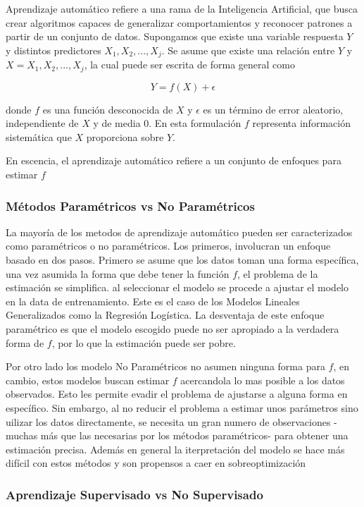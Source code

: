 \documentclass[a4paper,12pt]{Latex/Classes/PhDthesisPSnPDF}
\begin{document}
Aprendizaje automático refiere a una rama de la Inteligencia Artificial, que busca crear algoritmos capaces de generalizar comportamientos y reconocer patrones a partir de un conjunto de datos. Supongamos que existe una variable respuesta $Y$ y distintos predictores $X_{1}, X_{2}, ..., X_{j}$. Se asume que existe una relación entre $Y$ y $X = X_{1}, X_{2}, ..., X_{j}$, la cual puede ser escrita de forma general como

$$ Y = f(X) + \epsilon $$

donde $f$ es una función desconocida de $X$ y $\epsilon$ es un término de error aleatorio, independiente de $X$ y de media 0. En esta formulación $f$ representa información sistemática que $X$ proporciona sobre $Y$.

En escencia, el aprendizaje automático refiere a un conjunto de enfoques para estimar $f$

\subsubsection{Métodos Paramétricos vs No Paramétricos}

La mayoría de los metodos de aprendizaje automático pueden ser caracterizados como paramétricos o no paramétricos. Los primeros, involucran un enfoque basado en dos pasos. Primero se asume que los datos toman una forma específica, una vez asumida la forma que debe tener la función $f$, el problema de la estimación se simplifica. al seleccionar el modelo se procede a ajustar el modelo en la data de entrenamiento. Este es el caso de los Modelos Lineales Generalizados como la Regresión Logística. La desventaja de este enfoque paramétrico es que el modelo escogido puede no ser apropiado a la verdadera forma de $f$, por lo que la estimación puede ser pobre.

Por otro lado los modelo No Paramétricos no asumen ninguna forma para $f$, en cambio, estos modelos buscan estimar $f$ acercandola lo mas posible a los datos observados. Esto les permite evadir el problema de ajustarse a alguna forma en específico. Sin embargo, al no reducir el problema a estimar unos parámetros sino uilizar los datos directamente, se necesita un gran numero de observaciones -muchas más que las necesarias por los métodos paramétricos- para obtener una estimación precisa. Además en general la iterpretación del modelo se hace más difícil con estos métodos y son propensos a caer en sobreoptimización

\subsubsection{Aprendizaje Supervisado vs No Supervisado}
\end{document}
